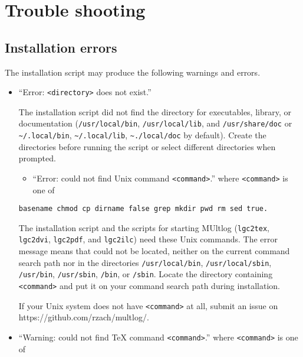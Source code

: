 \documentclass[]{article}
\providecommand{\tightlist}{%
  \setlength{\itemsep}{0pt}\setlength{\parskip}{0pt}}
\begin{document}
\hypertarget{trouble-shooting}{%
\section{Trouble shooting}\label{trouble-shooting}}

\hypertarget{installation-errors}{%
\subsection{Installation errors}\label{installation-errors}}

The installation script may produce the following warnings and errors.

\begin{itemize}
\item
  ``Error: \texttt{\textless{}directory\textgreater{}} does not exist.''

  The installation script did not find the directory for executables,
  library, or documentation (\texttt{/usr/local/bin},
  \texttt{/usr/local/lib}, and \texttt{/usr/share/doc} or
  \texttt{\textasciitilde{}/.local/bin},
  \texttt{\textasciitilde{}/.local/lib},
  \texttt{\textasciitilde{}./local/doc} by default). Create the
  directories before running the script or select different directories
  when prompted.

  \begin{itemize}
  \tightlist
  \item
    ``Error: could not find Unix command
    \texttt{\textless{}command\textgreater{}}.'' where
    \texttt{\textless{}command\textgreater{}} is one of
  \end{itemize}

\begin{verbatim}
basename chmod cp dirname false grep mkdir pwd rm sed true.
\end{verbatim}

  The installation script and the scripts for starting MUltlog
  (\texttt{lgc2tex}, \texttt{lgc2dvi}, \texttt{lgc2pdf}, and
  \texttt{lgc2ilc}) need these Unix commands. The error message means
  that could not be located, neither on the current command search path
  nor in the directories \texttt{/usr/local/bin},
  \texttt{/usr/local/sbin}, \texttt{/usr/bin}, \texttt{/usr/sbin},
  \texttt{/bin}, or \texttt{/sbin}. Locate the directory containing
  \texttt{\textless{}command\textgreater{}} and put it on your command
  search path during installation.

  If your Unix system does not have
  \texttt{\textless{}command\textgreater{}} at all, submit an issue on
  https://github.com/rzach/multlog/.
\item
  ``Warning: could not find TeX command
  \texttt{\textless{}command\textgreater{}}.'' where
  \texttt{\textless{}command\textgreater{}} is one of


\end{itemize}
\end{document}
